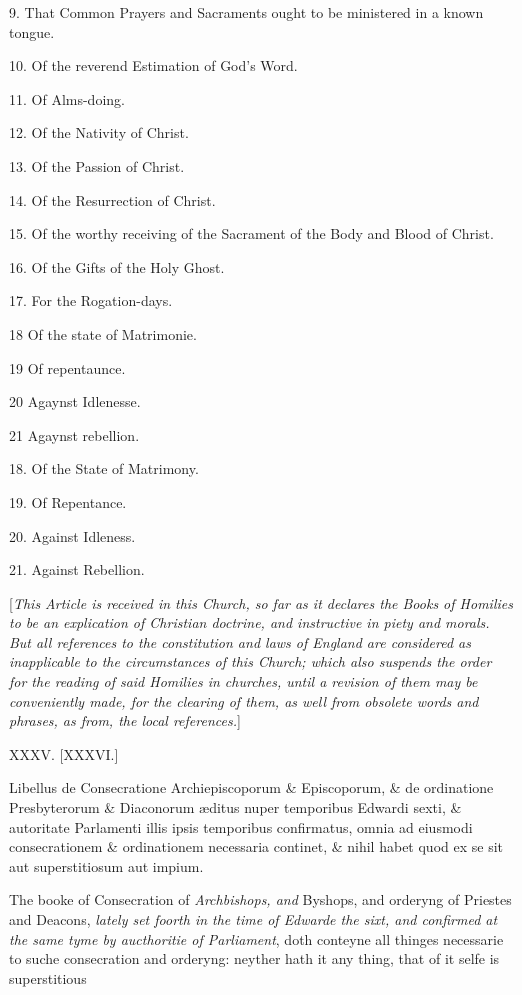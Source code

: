 9. That Common Prayers and Sacraments ought to be ministered in a known tongue.

10. Of the reverend Estimation of God's Word.

11. Of Alms-doing.

12. Of the Nativity of Christ.

13. Of the Passion of Christ.

14. Of the Resurrection of Christ.

15. Of the worthy receiving of the Sacrament of the Body and Blood of Christ.

16. Of the Gifts of the Holy Ghost.

17. For the Rogation-days.

18 Of the state of Matrimonie.

19 Of repentaunce.

20 Agaynst Idlenesse.

21 Agaynst rebellion.

18. Of the State of Matrimony.

19. Of Repentance.

20. Against Idleness.

21. Against Rebellion.

[\emph{This Article is received in this Church, so far as it declares the Books of Homilies to be an explication of Christian doctrine, and instructive in piety and morals. But all references to the constitution and laws of England are considered as inapplicable to the circumstances of this Church; which also suspends the order for the reading of said Homilies in churches, until a revision of them may be conveniently made, for the clearing of them, as well from obsolete words and phrases, as from, the local references.}]

XXXV. [XXXVI.]


Libellus de Consecratione Archiepiscoporum \& Episcoporum, \& de ordinatione Presbyterorum \& Diaconorum æditus nuper temporibus Edwardi sexti, \& autoritate Parlamenti illis ipsis temporibus confirmatus, omnia ad eiusmodi consecrationem \& ordinationem necessaria continet, \& nihil habet quod ex se sit aut superstitiosum aut impium.

The booke of Consecration of \emph{Archbishops, and} Byshops, and orderyng of Priestes and Deacons, \emph{lately set foorth in the time of Edwarde the sixt, and confirmed at the same tyme by aucthoritie of Parliament}, doth conteyne all thinges necessarie to suche consecration and orderyng: neyther hath it any thing, that of it selfe is superstitious

